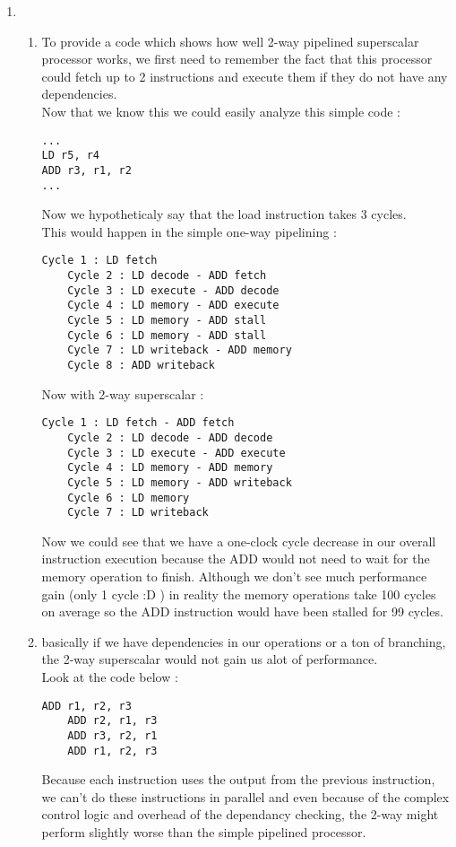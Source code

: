 \begin{enumerate}
    \item 
    \begin{enumerate}
        \item To provide a code which shows how well 2-way pipelined superscalar processor works, we first need to 
        remember the fact that this processor could fetch up to 2 instructions and execute them if they do not
        have any dependencies. \\
        Now that we know this we could easily analyze this simple code : 
\begin{lstlisting}[style=mystyle]
... 
LD r5, r4
ADD r3, r1, r2
...
\end{lstlisting}
    Now we hypotheticaly say that the load instruction 
    takes 3 cycles.\\ 
    This would happen in the simple one-way pipelining : 
\begin{lstlisting}[style=mystyle]
    Cycle 1 : LD fetch 
    Cycle 2 : LD decode - ADD fetch 
    Cycle 3 : LD execute - ADD decode 
    Cycle 4 : LD memory - ADD execute 
    Cycle 5 : LD memory - ADD stall 
    Cycle 6 : LD memory - ADD stall
    Cycle 7 : LD writeback - ADD memory 
    Cycle 8 : ADD writeback 
\end{lstlisting}
    Now with 2-way superscalar : 
\begin{lstlisting}[style=mystyle]
    Cycle 1 : LD fetch - ADD fetch
    Cycle 2 : LD decode - ADD decode 
    Cycle 3 : LD execute - ADD execute 
    Cycle 4 : LD memory - ADD memory 
    Cycle 5 : LD memory - ADD writeback 
    Cycle 6 : LD memory
    Cycle 7 : LD writeback
\end{lstlisting}    

    Now we could see that we have a one-clock cycle decrease 
    in our overall instruction execution because the ADD would not need to 
    wait for the memory operation to finish. Although we don't see 
    much performance gain (only 1 cycle :D ) in reality the memory operations 
    take 100 cycles on average so the ADD instruction would have been stalled for 99 cycles.
    
    
    \item basically if we have dependencies in our operations or a ton of branching, the 
    2-way superscalar would not gain us alot of performance. 
    \\ 
    Look at the code below : 
\begin{lstlisting}[style=mystyle] 
    ADD r1, r2, r3
    ADD r2, r1, r3
    ADD r3, r2, r1
    ADD r1, r2, r3
\end{lstlisting}
    Because each instruction uses the output from the 
    previous instruction, we can't do these instructions in parallel 
    and even because of the complex control logic and overhead of the dependancy checking, 
    the 2-way might perform slightly worse than the simple pipelined processor.
    

\end{enumerate}
\end{enumerate}
